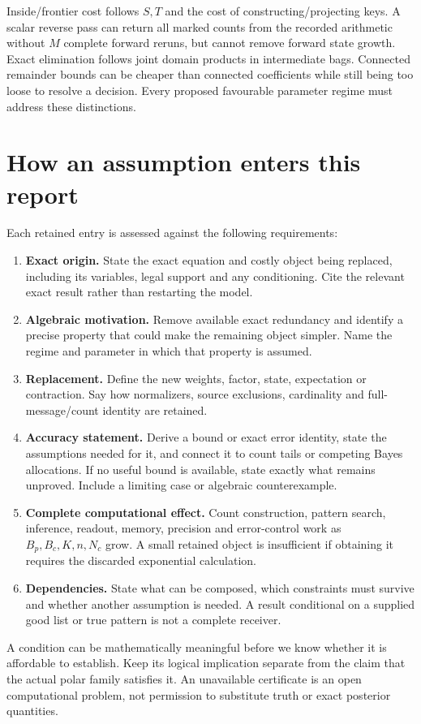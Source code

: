 \documentclass[10pt,a4paper]{article}
\begin{document}
Inside/frontier cost follows $S,T$ and the cost of constructing/projecting keys. A scalar reverse pass can
return all marked counts from the recorded arithmetic without $M$ complete forward reruns, but cannot
remove forward state growth. Exact elimination follows joint domain products in intermediate bags.
Connected remainder bounds can be cheaper than connected coefficients while still being too loose to
resolve a decision. Every proposed favourable parameter regime must address these distinctions.

\section{How an assumption enters this report}
Each retained entry is assessed against the following requirements:
\begin{enumerate}
\item \textbf{Exact origin.} State the exact equation and costly object being replaced, including its variables,
      legal support and any conditioning. Cite the relevant exact result rather than restarting the model.
\item \textbf{Algebraic motivation.} Remove available exact redundancy and identify a precise property that could
      make the remaining object simpler. Name the regime and parameter in which that property is assumed.
\item \textbf{Replacement.} Define the new weights, factor, state, expectation or contraction. Say how normalizers,
      source exclusions, cardinality and full-message/count identity are retained.
\item \textbf{Accuracy statement.} Derive a bound or exact error identity, state the assumptions needed for it,
      and connect it to count tails or competing Bayes allocations. If no useful bound is available, state
      exactly what remains unproved. Include a limiting case or algebraic counterexample.
\item \textbf{Complete computational effect.} Count construction, pattern search, inference, readout, memory,
      precision and error-control work as $B_p,B_c,K,n,N_c$ grow. A small retained object is insufficient if
      obtaining it requires the discarded exponential calculation.
\item \textbf{Dependencies.} State what can be composed, which constraints must survive and whether another
      assumption is needed. A result conditional on a supplied good list or true pattern is not a complete receiver.
\end{enumerate}
A condition can be mathematically meaningful before we know whether it is affordable to establish. Keep its
logical implication separate from the claim that the actual polar family satisfies it. An unavailable
certificate is an open computational problem, not permission to substitute truth or exact posterior quantities.
\end{document}

